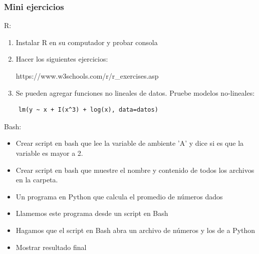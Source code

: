 \documentclass[14pt,aspectratio=169,xcolor=dvipsnames]{beamer}
\begin{document}
\begin{frame}
    \maketitle
\end{frame}
\begin{frame}\frametitle{Mini ejercicios}
    \begin{tiny}
    R: 
    \begin{enumerate}
        \item Instalar R en su computador y probar consola
        \item Hacer los siguientes ejercicios: 
            \begin{center}
                https://www.w3schools.com/r/r\_exercises.asp
            \end{center}
        \item Se pueden agregar funciones no lineales de datos. Pruebe modelos no-lineales:
    \end{enumerate}

            \begin{verbatim}
    lm(y ~ x + I(x^3) + log(x), data=datos)
            \end{verbatim}

Bash:
    \begin{itemize}
        \item Crear script en bash que lee la variable de ambiente 'A' y dice si es que la variable es mayor a 2.
        \item Crear script en bash que muestre el nombre y contenido de todos los archivos  en la carpeta.
        \item Un programa en Python que calcula el promedio de números dados
        \item Llamemos este programa desde un script en Bash
        \item Hagamos que el script en Bash abra un archivo de números y los de a Python
        \item Mostrar resultado final
    \end{itemize}

\end{tiny}
\end{frame}
\end{document}
